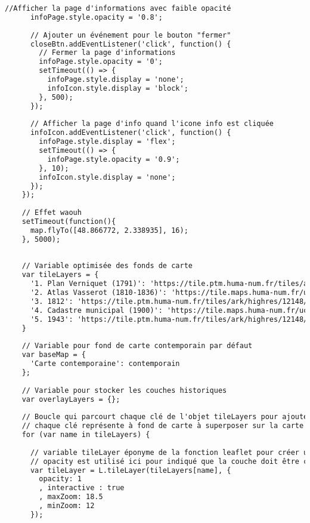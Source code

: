 \begin{lstlisting}[language=HTML, caption=Script JavaScript]
      //Afficher la page d'informations avec faible opacité
      infoPage.style.opacity = '0.8';
      
      // Ajouter un événement pour le bouton "fermer"
      closeBtn.addEventListener('click', function() {
        // Fermer la page d'informations
        infoPage.style.opacity = '0';
        setTimeout(() => {
          infoPage.style.display = 'none';
          infoIcon.style.display = 'block';
        }, 500);
      });
      
      // Afficher la page d'info quand l'icone info est cliquée
      infoIcon.addEventListener('click', function() {
        infoPage.style.display = 'flex';
        setTimeout(() => {
          infoPage.style.opacity = '0.9';
        }, 10);
        infoIcon.style.display = 'none';
      });
    });
    
    // Effet waouh
    setTimeout(function(){
      map.flyTo([48.866772, 2.338935], 16);
    }, 5000);
    
    
    // Variable optimisée des fonds de carte
    var tileLayers = {
      '1. Plan Verniquet (1791)': 'https://tile.ptm.huma-num.fr/tiles/ark/highres/12148/btv1b55013275x/{z}/{x}/{y}.webp',
      '2. Atlas Vasserot (1810-1836)': 'https://tile.maps.huma-num.fr/uc2usU/d/Alpage_Vasserot_1830/{z}/{x}/{y}.png',
      '3. 1812': 'https://tile.ptm.huma-num.fr/tiles/ark/highres/12148/btv1b530851375/{z}/{x}/{y}.webp',
      '4. Cadastre municipal (1900)': 'https://tile.maps.huma-num.fr/uc2usU/d/MOSA_1900_PARIS/{z}/{x}/{y}.png',
      '5. 1943': 'https://tile.ptm.huma-num.fr/tiles/ark/highres/12148/btv1b53121232b/{z}/{x}/{y}.webp', 
    }
    
    // Variable pour fond de carte contemporain par défaut 
    var baseMap = {
      'Carte contemporaine': contemporain
    };
    
    // Variable pour stocker les couches historiques
    var overlayLayers = {};
    
    // Boucle qui parcourt chaque clé de l'objet tileLayers pour ajouter les couches historiques (tileLayer)
    // chaque clé représente à fond de carte à superposer sur la carte par défaut        
    for (var name in tileLayers) {
      
      // variable tileLayer éponyme de la fonction leaflet pour créer une couche de tuiles à partir de l'URL fournie (la valeur de la clé)
      // opacity est utilisé ici pour indiqué que la couche doit être complètement opaque (from 0 to 1)
      var tileLayer = L.tileLayer(tileLayers[name], {
        opacity: 1
        , interactive : true
        , maxZoom: 18.5
        , minZoom: 12
      });
      

\end{lstlisting}
